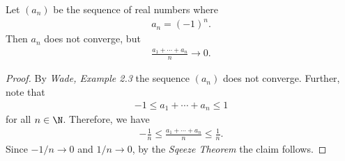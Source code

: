 \documentclass{article}
\begin{document}
\begin{claim}
   Let $(a_n)$ be the sequence of real numbers
   where
   \begin{align*}
      a_n = (-1)^n.
   \end{align*}
   Then $a_n$ does not converge, but
   \begin{align*}
      \frac{a_1+\cdots+a_n}{n} \to 0.
   \end{align*}
   \begin{proof}
      By \emph{Wade, Example 2.3} the sequence $(a_n)$ does not converge.
      Further, note that
      \begin{align*}
         -1 \leq a_1 + \cdots + a_n \leq 1
      \end{align*}
      for all $n\in\N$. Therefore, we have 
      \begin{align*}
         -\frac{1}{n}\leq \frac{a_1+\cdots+a_n}{n} \leq \frac{1}{n}.
      \end{align*}
      Since $-1/n\to 0$ and $1/n\to 0$, by the \emph{Sqeeze Theorem} the claim follows.
   \end{proof}
\end{claim}
\end{document}
